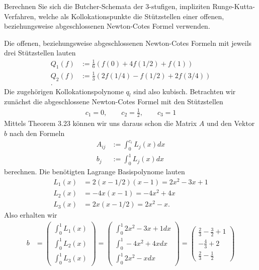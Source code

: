 \begin{exercise}
Berechnen Sie sich die Butcher-Schemata der 3-stufigen, impliziten Runge-Kutta-Verfahren,
welche als Kollokationspunkte die Stützstellen einer offenen, beziehungsweise
abgeschlossenen Newton-Cotes Formel verwenden.
\end{exercise}
\begin{solution}
Die offenen, beziehungsweise abgeschlossenen Newton-Cotes Formeln mit jeweils
drei Stützstellen lauten
\begin{align*}
  Q_1(f) &:= \frac{1}{6}(f(0) + 4f(1/2) + f(1))\\
  Q_2(f) &:= \frac{1}{3}(2f(1/4) - f(1/2) + 2f(3/4))\\.
\end{align*}
Die zugehörigen Kollokationspolynome $q_l$ sind also kubisch.
Betrachten wir zunächst die abgeschlossene Newton-Cotes Formel mit den Stützstellen
\begin{align*}
  c_1 = 0, \qquad c_2 = \frac{1}{2}, \qquad c_3 = 1
\end{align*}
Mittels Theorem 3.23 können wir uns daraus schon die Matrix $A$ und den Vektor $b$
nach den Formeln
\begin{align}
  A_{ij} &:= \int_0^{c_i} L_j(x) dx \\
  b_j &:= \int_0^1 L_j(x) dx
\end{align}
berechnen. Die benötigten Lagrange Basispolynome lauten
\begin{align*}
  L_1(x) &= 2(x - 1/2)(x - 1) = 2x^2 - 3x + 1\\
  L_2(x) &= -4x(x - 1) = -4x^2 + 4x\\
  L_3(x) &= 2x(x - 1/2) = 2x^2 - x.
\end{align*}
Also erhalten wir
\begin{align*}
  b &= \begin{pmatrix}
    \int_0^1 L_1(x) \\ \int_0^1 L_2(x) \\ \int_0^1 L_3(x)
  \end{pmatrix}
  = \begin{pmatrix}
    \int_0^1 2x^2 - 3x + 1 dx \\
    \int_0^1 -4x^2 + 4x dx \\
    \int_0^1 2x^2 - x dx
  \end{pmatrix}
  = \begin{pmatrix}
     \frac{2}{3} - \frac{3}{2} + 1 \\-\frac{4}{3} + 2 \\ \frac{2}{3} - \frac{1}{2}

\end{pmatrix}
\end{align*}
\end{solution}
